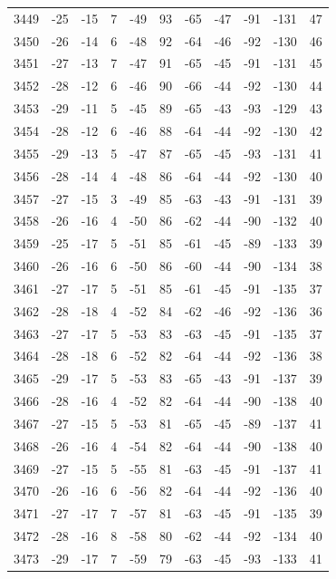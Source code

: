 \begin{table}[H]
\begin{tabular}{lllllllllll}
3449 & -25 & -15 & 7 & -49 & 93 & -65 & -47 & -91 & -131 & 47 \\
3450 & -26 & -14 & 6 & -48 & 92 & -64 & -46 & -92 & -130 & 46 \\
3451 & -27 & -13 & 7 & -47 & 91 & -65 & -45 & -91 & -131 & 45 \\
3452 & -28 & -12 & 6 & -46 & 90 & -66 & -44 & -92 & -130 & 44 \\
3453 & -29 & -11 & 5 & -45 & 89 & -65 & -43 & -93 & -129 & 43 \\
3454 & -28 & -12 & 6 & -46 & 88 & -64 & -44 & -92 & -130 & 42 \\
3455 & -29 & -13 & 5 & -47 & 87 & -65 & -45 & -93 & -131 & 41 \\
3456 & -28 & -14 & 4 & -48 & 86 & -64 & -44 & -92 & -130 & 40 \\
3457 & -27 & -15 & 3 & -49 & 85 & -63 & -43 & -91 & -131 & 39 \\
3458 & -26 & -16 & 4 & -50 & 86 & -62 & -44 & -90 & -132 & 40 \\
3459 & -25 & -17 & 5 & -51 & 85 & -61 & -45 & -89 & -133 & 39 \\
3460 & -26 & -16 & 6 & -50 & 86 & -60 & -44 & -90 & -134 & 38 \\
3461 & -27 & -17 & 5 & -51 & 85 & -61 & -45 & -91 & -135 & 37 \\
3462 & -28 & -18 & 4 & -52 & 84 & -62 & -46 & -92 & -136 & 36 \\
3463 & -27 & -17 & 5 & -53 & 83 & -63 & -45 & -91 & -135 & 37 \\
3464 & -28 & -18 & 6 & -52 & 82 & -64 & -44 & -92 & -136 & 38 \\
3465 & -29 & -17 & 5 & -53 & 83 & -65 & -43 & -91 & -137 & 39 \\
3466 & -28 & -16 & 4 & -52 & 82 & -64 & -44 & -90 & -138 & 40 \\
3467 & -27 & -15 & 5 & -53 & 81 & -65 & -45 & -89 & -137 & 41 \\
3468 & -26 & -16 & 4 & -54 & 82 & -64 & -44 & -90 & -138 & 40 \\
3469 & -27 & -15 & 5 & -55 & 81 & -63 & -45 & -91 & -137 & 41 \\
3470 & -26 & -16 & 6 & -56 & 82 & -64 & -44 & -92 & -136 & 40 \\
3471 & -27 & -17 & 7 & -57 & 81 & -63 & -45 & -91 & -135 & 39 \\
3472 & -28 & -16 & 8 & -58 & 80 & -62 & -44 & -92 & -134 & 40 \\
3473 & -29 & -17 & 7 & -59 & 79 & -63 & -45 & -93 & -133 & 41 \\

\end{tabular}
\end{table}

